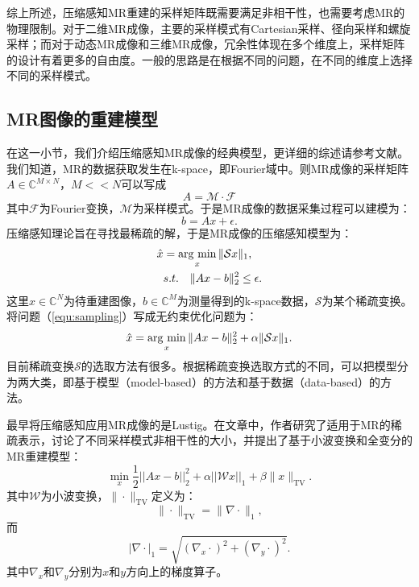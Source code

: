 综上所述，压缩感知MR重建的采样矩阵既需要满足非相干性，也需要考虑MR的物理限制。对于二维MR成像，主要的采样模式有Cartesian采样、径向采样和螺旋采样；而对于动态MR成像和三维MR成像，冗余性体现在多个维度上，采样矩阵的设计有着更多的自由度。一般的思路是在根据不同的问题，在不同的维度上选择不同的采样模式。

\subsection{MR图像的重建模型}
\label{sec:models}
在这一小节，我们介绍压缩感知MR成像的经典模型，更详细的综述请参考文献\cite{ravishankar2019image,ye2019compressed}。我们知道，MR的数据获取发生在k-space，即Fourier域中。则MR成像的采样矩阵$A\in \mathbb{C}^{M\times N}$，$M<<N$可以写成
\begin{equation}
	A=\mathcal{M\cdot F}
\end{equation}
其中$\mathcal{F}$为Fourier变换，$\mathcal{M}$为采样模式。于是MR成像的数据采集过程可以建模为：
\begin{equation}
	b=Ax+\epsilon.
\end{equation}
压缩感知理论旨在寻找最稀疏的解，于是MR成像的压缩感知模型为：
\begin{equation}
\begin{aligned}
	\hat{x}&=\argmin_x \|\mathcal{S}x\|_1,\\
	&s.t.\quad \|Ax-b\|_2^2 \leq \epsilon.
	\label{equ:sampling}
\end{aligned}
\end{equation}
这里$x\in \mathbb{C}^N$为待重建图像，$b\in\mathbb{C}^M$为测量得到的k-space数据，$\mathcal{S}$为某个稀疏变换。将问题（\ref{equ:sampling}）写成无约束优化问题为：
\begin{equation}
	\hat{x}=\argmin_x \|Ax-b\|^2_2+\alpha\|\mathcal{S}x\|_1.
\end{equation}
目前稀疏变换$\mathcal{S}$的选取方法有很多。根据稀疏变换选取方式的不同，可以把模型分为两大类，即基于模型（model-based）的方法和基于数据（data-based）的方法。

最早将压缩感知应用MR成像的是Lustig\cite{lustig2006}。在文章中，作者研究了适用于MR的稀疏表示，讨论了不同采样模式非相干性的大小，并提出了基于小波变换和全变分的MR重建模型：
\begin{equation}
	\min_x\frac{1}{2}||Ax-b||^2_2+\alpha ||\mathcal{W}x||_1+\beta \|x\|_\mathrm{TV}.
	\label{equ:wandtv}
\end{equation}
其中$\mathcal{W}$为小波变换，$\|\cdot\|_\mathrm{TV}$定义为：
$$\|\cdot\|_\mathrm{TV} = \|\nabla\cdot\|_1,$$
而
$$|\nabla\cdot|_1=\sqrt{(\nabla_x \cdot)^2+(\nabla_y \cdot)^2}.$$
其中$\nabla_x$和$\nabla_y$分别为$x$和$y$方向上的梯度算子。

